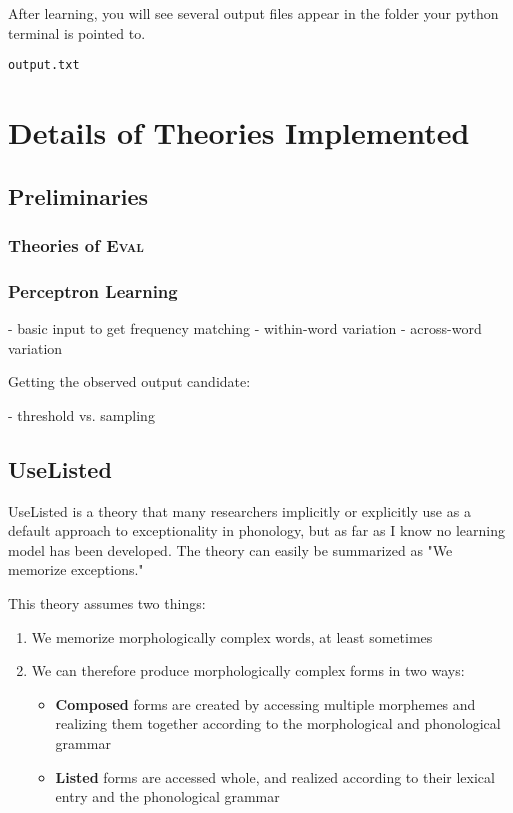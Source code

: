 \documentclass[12]{article}
\begin{document}
After learning, you will see several output files appear in the folder your python terminal is pointed to.

\texttt{output.txt}


\section{Details of Theories Implemented}
	\subsection{Preliminaries}
		\subsubsection{Theories of \textsc{Eval}}

		\subsubsection{Perceptron Learning}
		
		- basic input to get frequency matching
			- within-word variation
			- across-word variation
		
		
		Getting the observed output candidate:
		
		- threshold vs. sampling
		
		
	\subsection{UseListed}
		UseListed is a theory that many researchers implicitly or explicitly use as a default approach to exceptionality in phonology, but as far as I know no learning model has been developed.  The theory can easily be summarized as "We memorize exceptions."
		
		This theory assumes two things:
		\begin{enumerate}
			\item We memorize morphologically complex words, at least sometimes
			\item We can therefore produce morphologically complex forms in two ways:
			\begin{itemize}
				\item {\bf Composed} forms are created by accessing multiple morphemes and realizing them together according to the morphological and phonological grammar
				\item {\bf Listed} forms are accessed whole, and realized according to their lexical entry and the phonological grammar
			\end{itemize}
		\end{enumerate}
	
\end{document}
